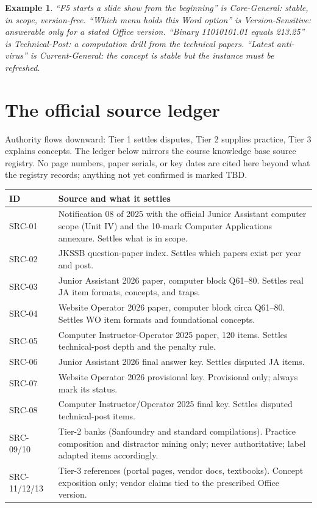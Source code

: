 \documentclass[11pt]{article}
\newtheorem{example}{Example}[section]
\begin{document}
\begin{example}
``F5 starts a slide show from the beginning'' is Core-General: stable, in
scope, version-free. ``Which menu holds this Word option'' is
Version-Sensitive: answerable only for a stated Office version. ``Binary
11010101.01 equals 213.25'' is Technical-Post: a computation drill from the
technical papers. ``Latest anti-virus'' is Current-General: the concept is
stable but the instance must be refreshed.
\end{example}

\section{The official source ledger}

Authority flows downward: Tier 1 settles disputes, Tier 2 supplies practice,
Tier 3 explains concepts. The ledger below mirrors the course knowledge base
source registry. No page numbers, paper serials, or key dates are cited here
beyond what the registry records; anything not yet confirmed is marked TBD.

\begin{center}
\begin{tabular}{p{}p{}}
\toprule
\textbf{ID} & \textbf{Source and what it settles} \\
\midrule
SRC-01 & Notification 08 of 2025 with the official Junior Assistant computer scope (Unit IV) and the 10-mark Computer Applications annexure. Settles what is in scope. \\
SRC-02 & JKSSB question-paper index. Settles which papers exist per year and post. \\
SRC-03 & Junior Assistant 2026 paper, computer block Q61--80. Settles real JA item formats, concepts, and traps. \\
SRC-04 & Website Operator 2026 paper, computer block circa Q61--80. Settles WO item formats and foundational concepts. \\
SRC-05 & Computer Instructor-Operator 2025 paper, 120 items. Settles technical-post depth and the penalty rule. \\
SRC-06 & Junior Assistant 2026 final answer key. Settles disputed JA items. \\
SRC-07 & Website Operator 2026 provisional key. Provisional only; always mark its status. \\
SRC-08 & Computer Instructor/Operator 2025 final key. Settles disputed technical-post items. \\
\midrule
SRC-09/10 & Tier-2 banks (Sanfoundry and standard compilations). Practice composition and distractor mining only; never authoritative; label adapted items accordingly. \\
SRC-11/12/13 & Tier-3 references (portal pages, vendor docs, textbooks). Concept exposition only; vendor claims tied to the prescribed Office version. \\
\bottomrule
\end{tabular}
\end{center}
\end{document}
